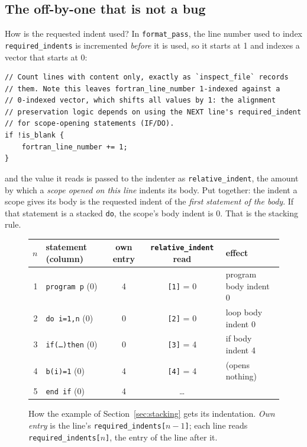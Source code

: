 \documentclass[11pt,a4paper,openany]{book}
\newcommand{\code}[1]{\texttt{\small #1}}
\begin{document}
\subsection{The off-by-one that is not a bug}

How is the requested indent used? In \code{format\_pass}, the line number used
to index \code{required\_indents} is incremented \emph{before} it is used, so
it starts at 1 and indexes a vector that starts at 0:

\begin{lstlisting}[style=rust]
// Count lines with content only, exactly as `inspect_file` records
// them. Note this leaves fortran_line_number 1-indexed against a
// 0-indexed vector, which shifts all values by 1: the alignment
// preservation logic depends on using the NEXT line's required_indent
// for scope-opening statements (IF/DO).
if !is_blank {
    fortran_line_number += 1;
}
\end{lstlisting}

and the value it reads is passed to the indenter as \code{relative\_indent},
the amount by which a \emph{scope opened on this line} indents its body. Put
together: the indent a scope gives its body is the requested indent of the
\emph{first statement of the body}. If that statement is a stacked
\code{do}, the scope's body indent is 0. That is the stacking rule.

\begin{figure}[ht]
\centering
\small
\begin{tabular}{@{}r l c c l@{}}
\toprule
$n$ & statement (column) & own entry & \code{relative\_indent} read & effect\\
\midrule
1 & \code{program p} (0)      & 4 & \code{[1]} = 0 & program body indent 0\\
2 & \code{do i=1,n} (0)       & 0 & \code{[2]} = 0 & loop body indent 0\\
3 & \code{if(\ldots)then} (0) & 0 & \code{[3]} = 4 & if body indent 4\\
4 & \code{b(i)=1} (0)         & 4 & \code{[4]} = 4 & (opens nothing)\\
5 & \code{end if} (0)         & 4 & \ldots & \\
\bottomrule
\end{tabular}
\caption{How the example of Section~\ref{sec:stacking} gets its
indentation. \emph{Own entry} is the line's \code{required\_indents[$n-1$]};
each line reads \code{required\_indents[$n$]}, the entry of the line after it.}
\label{fig:offbyone}
\end{figure}
\end{document}
